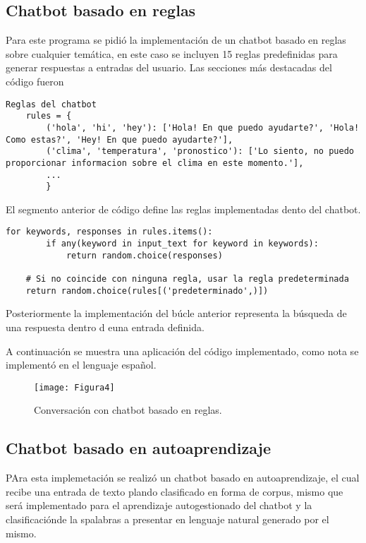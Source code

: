 \documentclass[a4paper,
               ]{jacow}
\begin{document}
\subsection{Chatbot basado en reglas}
Para este programa se pidió la implementación de un chatbot basado en reglas sobre cualquier temática, en este caso se incluyen 15 reglas predefinidas para generar respuestas a entradas del usuario. Las secciones más destacadas del código fueron 
\begin{lstlisting}
Reglas del chatbot
    rules = {
        ('hola', 'hi', 'hey'): ['Hola! En que puedo ayudarte?', 'Hola! Como estas?', 'Hey! En que puedo ayudarte?'],
        ('clima', 'temperatura', 'pronostico'): ['Lo siento, no puedo proporcionar informacion sobre el clima en este momento.'],
        ...
        }
\end{lstlisting}
El segmento anterior de código define las reglas implementadas dento del chatbot.

\begin{lstlisting}
for keywords, responses in rules.items():
        if any(keyword in input_text for keyword in keywords):
            return random.choice(responses)

    # Si no coincide con ninguna regla, usar la regla predeterminada
    return random.choice(rules[('predeterminado',)])
\end{lstlisting}

Posteriormente la implementación del búcle anterior representa la búsqueda de una respuesta dentro d euna entrada definida.

A continuación se muestra una aplicación del código implementado, como nota se implementó en el lenguaje español.

\begin{figure}[!htb]
   \centering
   \captionsetup{justification=centering}
    \texttt{[image: Figura4]}
    \caption{Conversación con chatbot basado en reglas.}
\end{figure}

\subsection{Chatbot basado en autoaprendizaje}
PAra esta implemetación se realizó un chatbot basado en autoaprendizaje, el cual recibe una entrada de texto plando clasificado en forma de corpus, mismo que será implementado para el aprendizaje autogestionado del chatbot y la clasificaciónde la spalabras a presentar en lenguaje natural generado por el mismo.
\end{document}
